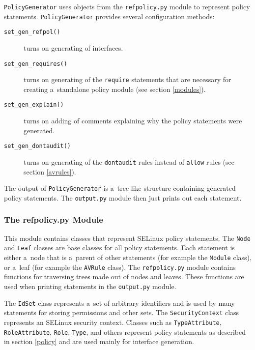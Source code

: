 \texttt{PolicyGenerator} uses objects from the \texttt{refpolicy.py} module
to represent policy statements. \texttt{PolicyGenerator} provides several
configuration methods:
\begin{description}
    \item [\texttt{set\_gen\_refpol()}] turns on generating of interfaces.
    \item [\texttt{set\_gen\_requires()}] turns on generating of the
        \texttt{require} statements that are necessary for creating
        a~standalone policy module (see section \ref{modules}).
    \item [\texttt{set\_gen\_explain()}] turns on adding of comments explaining
        why the policy statements were generated.
    \item [\texttt{set\_gen\_dontaudit()}] turns on generating of the
        \texttt{dontaudit} rules instead of \texttt{allow} rules (see section
        \ref{avrules}).
\end{description}
The output of \texttt{PolicyGenerator} is a~tree-like structure containing
generated policy statements. The \texttt{output.py} module then just prints out
each statement.

\subsubsection{The refpolicy.py Module}
This module contains classes that represent SELinux policy statements. The
\texttt{Node} and \texttt{Leaf} classes are base classes for all policy
statements. Each statement is either a~node that is a~parent of other
statements (for example the \texttt{Module} class), or a~leaf (for example the
\texttt{AVRule} class). The \texttt{refpolicy.py} module contains functions for
traversing trees made out of nodes and leaves. These functions are used when
printing statements in the \texttt{output.py} module.

The \texttt{IdSet} class represents a~set of arbitrary identifiers and is used
by many statements for storing permissions and other sets. The
\texttt{SecurityContext} class represents an SELinux security context. Classes
such as \texttt{TypeAttribute}, \texttt{RoleAttribute}, \texttt{Role},
\texttt{Type}, and others represent policy statements as described in section
\ref{policy} and are used mainly for interface generation.


